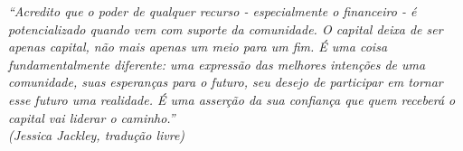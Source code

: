 \begin{epigrafe}
\vspace*{\fill}
\begin{flushright}
\emph{``Acredito que o poder de qualquer recurso - especialmente o financeiro - é potencializado quando vem com suporte da comunidade. O capital deixa de ser apenas capital, não mais apenas um meio para um fim. É uma coisa fundamentalmente diferente: uma expressão das melhores intenções de uma comunidade, suas esperanças para o futuro, seu desejo de participar em tornar esse futuro uma realidade. É uma asserção da sua confiança que quem receberá o capital vai liderar o caminho.'' \\ (Jessica Jackley, tradução livre)}
\end{flushright}
\end{epigrafe}